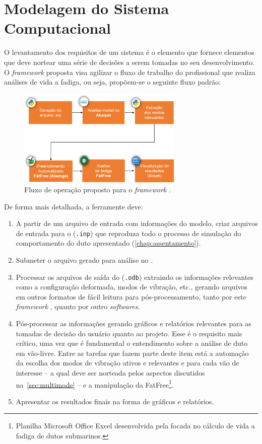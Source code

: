 \chapter{Modelagem do Sistema Computacional}\label{sec:software}

O levantamento dos requisitos de um sistema é o elemento que fornece elementos que deve nortear uma série de decisões a serem tomadas no seu desenvolvimento. O \textit{framework}  proposta visa agilizar o fluxo de trabalho do profissional que realiza análises de vida a fadiga, ou seja, propõem-se o seguinte fluxo padrão:

\begin{figure}[!ht]
    \centering
    \caption{Fluxo de operação proposto para o \textit{framework} .}\label{fig:workflow}
    \includegraphics[width=0.7\textwidth]{imagens/workflow}
\end{figure}

De forma mais detalhada, a ferramente deve:

\begin{enumerate}
    \item A partir de um arquivo de entrada com informações do modelo, criar arquivos de entrada para o \abaqus (\texttt{.inp}) que reproduza todo o processo de simulação do comportamento do duto apresentado (\autoref{chap:assentamento}).
    \item Submeter o arquivo gerado para análise no \abaqus.\@
    \item Processar os arquivos de saída do \abaqus (\texttt{.odb}) extraindo os informações relevantes como a configuração deformada, modos de vibração, etc., gerando arquivos em outros formatos de fácil leitura para pós-processamento, tanto por este \textit{framework} , quanto por outro \textit{softwares}.
    \item Pós-processar as informações gerando gráficos e relatórios relevantes para as tomadas de decisão do usuário quanto ao projeto. Esse é o requisito mais crítico, uma vez que é fundamental o entendimento sobre a análise de duto em vão-livre. Entre as tarefas que fazem parte deste item está a automação da escolha dos modos de vibração ativos e relevantes e para cada vão de interesse -- a qual deve ser norteada pelos aspectos discutidos na~\autoref{sec:multimode} -- e a manipulação da FatFree\footnote{Planilha Microsoft Office Excel desenvolvida pela \dnv focada no cálculo de vida a fadiga de dutos submarinos.}.
    \item Apresentar os resultados finais na forma de gráficos e relatórios.
\end{enumerate}

